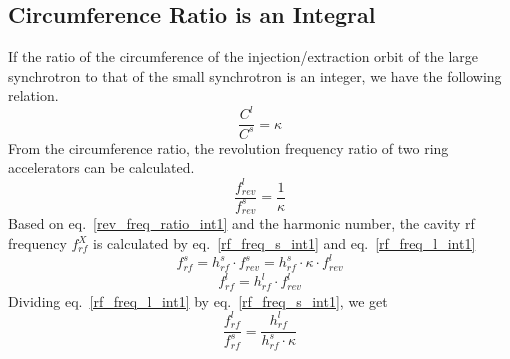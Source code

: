 %
 


\subsection{Circumference Ratio is an Integral}
\label{sec:cir_integer}
If the ratio of the circumference of the injection/extraction orbit of the large synchrotron to that of the small synchrotron is an integer, we have the following relation. 
\begin{equation}
\frac{C^l}{C^s}=\kappa \label{circumference_ratio_int1}
\end{equation}
From the circumference ratio, the revolution frequency ratio of two ring accelerators can be calculated.
\begin{equation}
\frac{f_{\mathit{rev}}^{l}}{f_{\mathit{rev}}^{s}}=\frac{1}{\kappa} \label{rev_freq_ratio_int1}
\end{equation}
Based on eq.~\ref{rev_freq_ratio_int1} and the harmonic number, the cavity rf frequency $f_{rf}^{X}$ is calculated by eq.~\ref{rf_freq_s_int1} and eq.~\ref{rf_freq_l_int1}
\begin{equation} 
f_{\mathit{rf}}^{s}= h^s_\mathit{rf} \cdot f_{\mathit{rev}}^{s}=h^s_\mathit{rf} \cdot \kappa \cdot f_{rev}^{l} \label{rf_freq_s_int1}
\end{equation}
\begin{equation} 
f_{\mathit{rf}}^{l}= h^l_\mathit{rf} \cdot f_{\mathit{rev}}^{l} \label{rf_freq_l_int1}
\end{equation}
Dividing eq.~\ref{rf_freq_l_int1} by eq.~\ref{rf_freq_s_int1}, we get
\begin{equation} 
\frac{f_{\mathit{rf}}^{l}}{f_{\mathit{rf}}^{s}}= \frac{h^l_\mathit{rf}}{h^s_\mathit{rf} \cdot \kappa} \label{rf_freq_ratio1}
\end{equation}

